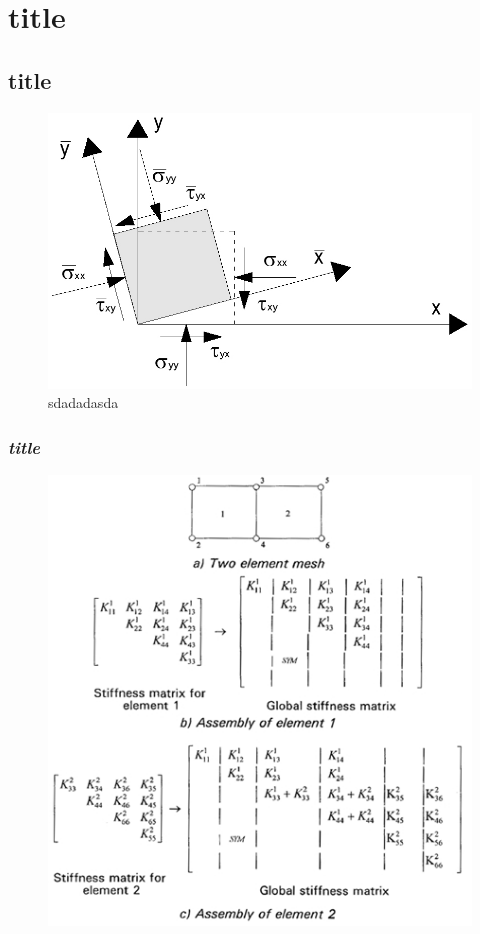 \chapter{title}
\lipsum[1-3]


\section{title}

\lipsum[1-3]


\begin{figure}
	\centering
	\includegraphics[width=0.7\linewidth]{Slike/2dtrans}
	\caption{sdadadasda}
	\label{fig:2dtrans}
\end{figure}


\subsection{\textit{title}}


\lipsum[1-3]

\begin{figure}
	\centering
	\includegraphics[width=0.7\linewidth]{Slike/assembly}
	\caption{}
	\label{fig:assembly}
\end{figure}


\lipsum[1-3]
\lipsum[1-3]